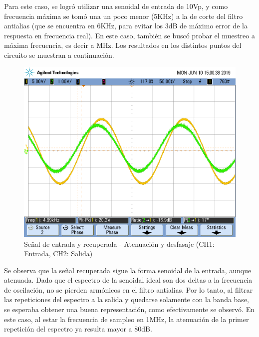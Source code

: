 \documentclass[assd_tp3_main.tex]{subfiles}
\begin{document}
Para este caso, se logró utilizar una senoidal de entrada de 10Vp, y como frecuencia máxima se tomó una un poco menor (5KHz) a la de corte del filtro antialias (que se encuentra en 6KHz, para evitar los 3dB de máximo error de la respuesta en frecuencia real). En este caso, también se buscó probar el muestreo a máxima frecuencia, es decir a MHz. Los resultados en los distintos puntos del circuito se muestran a continuación.

\begin{figure}[!ht]
\begin{centering}
\includegraphics[scale=0.25]{../EJ4/Mediciones/Seno/s1_1.png}
\par\end{centering}
\caption{Señal de entrada y recuperada - Atenuación y desfasaje (CH1: Entrada, CH2: Salida)}
\end{figure}

Se observa que la señal recuperada sigue la forma senoidal de la entrada, aunque atenuada. Dado que el espectro de la senoidal ideal son dos deltas a la frecuencia de oscilación, no se pierden armónicos en el filtro antialias. Por lo tanto, al filtrar las repeticiones del espectro a la salida y quedarse solamente con la banda base, se esperaba obtener una buena representación, como efectivamente se observó. En este caso, al estar la frecuencia de sampleo en 1MHz, la atenuación de la primer repetición del espectro ya resulta mayor a 80dB.
\end{document}
